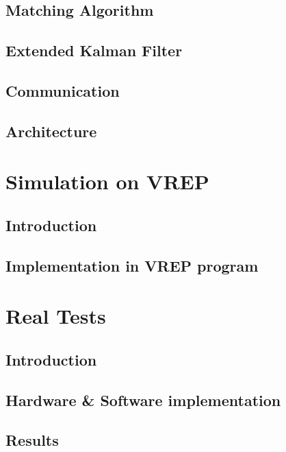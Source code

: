 \documentclass{book} %
\begin{document}
\section{Matching Algorithm}


\section{Extended Kalman Filter}


\section{Communication}


\section{Architecture}



\chapter{Simulation on VREP}
\section{Introduction}


\section{Implementation in VREP program}


\chapter{Real Tests}
\section{Introduction}
\section{Hardware \& Software implementation}
\section{Results}
\end{document}
